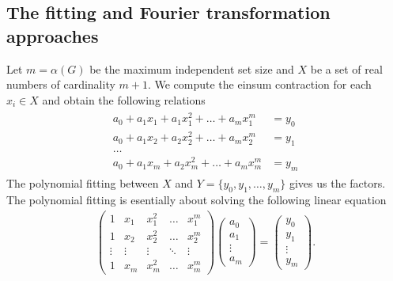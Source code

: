 \documentclass[review,onefignum,onetabnum]{siamart190516}
\newcommand{\<}{\langle}
\renewcommand{\>}{\rangle}
\begin{document}
\subsection{The fitting and Fourier transformation approaches}
Let $m=\alpha(G)$ be the maximum independent set size and $X$ be a set of real numbers of cardinality $m+1$.
We compute the einsum contraction for each $x_i \in X$ and obtain the following relations
\begin{align}
    \begin{split}
a_0 + a_1 x_1 + a_1 x_1^2 + \ldots + a_m x_1^m &= y_0\\
a_0 + a_1 x_2 + a_2 x_2^2 + \ldots + a_m x_2^m &= y_1\\
\ldots&\\
a_0 + a_1 x_m + a_2 x_m^2 + \ldots + a_m x_m^m& = y_m
    \end{split}
\end{align}
The polynomial fitting between $X$ and $Y = \{y_0, y_1, \ldots, y_m\}$ gives us the factors.
The polynomial fitting is esentially about solving the following linear equation
\begin{align}
\left(\begin{matrix}
1 & x_1 & x_1^2 & \ldots & x_1^m \\
1 & x_2 & x_2^2 & \ldots & x_2^m \\
\vdots & \vdots & \vdots &\ddots & \vdots \\
1 & x_m & x_m^2 & \ldots & x_m^m
\end{matrix}\right)
\left(\begin{matrix}
a_0 \\ a_1 \\ \vdots \\ a_m
\end{matrix}\right)
= \left(\begin{matrix}
y_0 \\ y_1 \\ \vdots \\ y_m
\end{matrix}\right).\label{eq:lineareq}
\end{align}
\end{document}
